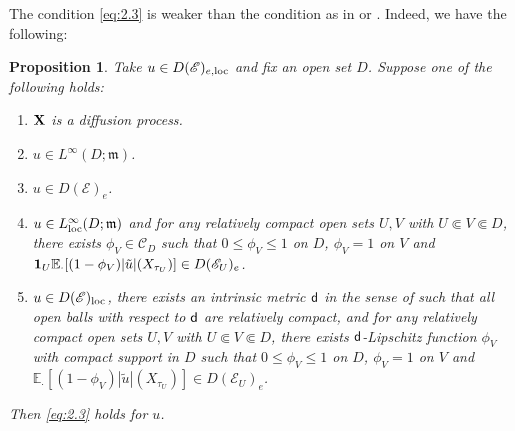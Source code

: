 \documentclass[12pt,a4paper]{article}
\newtheorem{prop}[thm]{Proposition}
\newcommand{\m}{\mathfrak{m} }
\newcommand{\loc}{{\rm loc}}
\newcommand{\1}{{\bf 1}}
\begin{document}
The condition \eqref{eq:2.3} is weaker than  
the condition as in \cite[(2.5)]{Chen} or \cite[(2.3)]{CK}. 
Indeed, we have the following:


\begin{prop}\label{prop:Sufficient}
Take $u\in D(\mathscr{E})_{e,\loc}$ and fix an open set $D$. Suppose one of the following holds: 
\begin{enumerate}
\item[{\rm(1)}] ${\bf X}$ is a diffusion process. 
\item[{\rm(2)}] $u\in L^{\infty}(D;{\m})$.
\item[{\rm(3)}] $u\in D(\mathscr{E})_e$. 
\item[{\rm(4)}] $u\in L^{\infty}_{\loc}(D;{\m})$ and 
for any relatively compact 
open sets $U,V$ with $U\Subset V\Subset D$,
there exists $\phi_V\in\mathscr{C}_D$ such that $0\leq\phi_V\leq1$ on $D$, $\phi_V=1$ on $V$ and 
$\1_U\mathbb{E}_{\cdot}[(1-\phi_V)|\tilde{u}|(X_{\tau_U})]\in D(\mathscr{E}_U)_e$. 
\item[{\rm (5)}] $u\in D(\mathscr{E})_{\loc}$, there exists an intrinsic metric ${\sf d}$ in the sense of 
\cite[Definition~4.1]{FLW} such that all open balls with respect to ${\sf d}$ are relatively compact, and 
for any relatively compact open sets $U,V$ with $U\Subset V\Subset D$,
there exists ${\sf d}$-Lipschitz function $\phi_V$ with 
compact support in $D$ such that  $0\leq\phi_V\leq1$ on $D$, $\phi_V=1$ on $V$ and 
$\mathbb{E}_{\cdot}[(1-\phi_V)|\tilde{u}|(X_{\tau_U})]\in D(\mathscr{E}_U)_e$. 
\end{enumerate}
Then \eqref{eq:2.3} holds for $u$. 
\end{prop}
\end{document}
